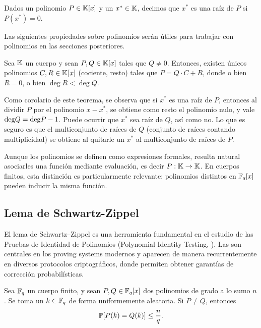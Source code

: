 \begin{definition}
\label{def:apendice-a-polinomios-raiz-de-un-polinomio}
	Dados un polinomio $P \in \mathbb{K}[x]$ y un $x^* \in \mathbb{K}$, decimos que $x^*$ es una raíz de $P$ si $P(x^*) = 0$.
\end{definition}

Las siguientes propiedades sobre polinomios serán útiles para trabajar con polinomios en las secciones posteriores.

\begin{theorem}
	Sea $\mathbb{K}$ un cuerpo y sean $P, Q \in \mathbb{K}[x]$ tales que $Q \neq 0$. Entonces, existen únicos polinomios $C, R \in \mathbb{K}[x]$ (cociente, resto) tales que $P = Q \cdot C + R$, donde o bien $R = 0$, o bien $\deg R < \deg Q$. 
\end{theorem}

Como corolario de este teorema, se observa que si $x^*$ es una raíz de $P$, entonces al dividir $P$ por el polinomio $x - x^*$, se obtiene como resto el polinomio nulo, y vale $\mathrm{deg} Q = \mathrm{deg} P - 1$. Puede ocurrir que $x^*$ sea raíz de $Q$, así como no. Lo que es seguro es que el multiconjunto de raíces de $Q$ (conjunto de raíces contando multiplicidad) se obtiene al quitarle un $x^*$ al multiconjunto de raíces de $P$.

Aunque los polinomios se definen como expresiones formales, resulta natural asociarles una función mediante evaluación, es decir $P: \mathbb{K} \to \mathbb{K}$. En cuerpos finitos, esta distinción es particularmente relevante: polinomios distintos en $\mathbb{F}_q[x]$ pueden inducir la misma función.

\subsection{Lema de Schwartz-Zippel}
\label{subsec:apendice-a-polinomios-lema-de-schwartz-zippel}

El lema de Schwartz–Zippel es una herramienta fundamental en el estudio de las Pruebas de Identidad de Polinomios (Polynomial Identity Testing, \PIT). Las \PIT son centrales en los proving systems modernos y aparecen de manera recurrentemente en diversos protocolos criptográficos, donde permiten obtener garantías de corrección probabilísticas.

\begin{theorem}
	Sea $\mathbb{F}_q$ un cuerpo finito, y sean $P, Q \in \mathbb{F}_q[x]$ dos polinomios de grado a lo sumo $n$. Se toma un $k \in \mathbb{F}_q$ de forma uniformemente aleatoria. Si $P \neq Q$, entonces
	$$\mathbb{P}[P(k) = Q(k)] \leq \frac{n}{q}.$$
\end{theorem}

